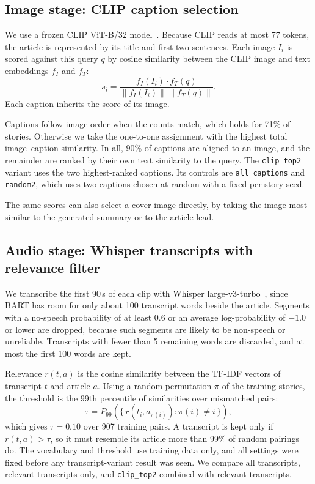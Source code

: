\documentclass[conference]{IEEEtran}
\begin{document}
\subsection{Image stage: CLIP caption selection}
We use a frozen CLIP ViT-B/32 model~\cite{radford2021clip}. Because CLIP reads at most 77 tokens, the article is represented by its title and first two sentences. Each image $I_i$ is scored against this query $q$ by cosine similarity between the CLIP image and text embeddings $f_I$ and $f_T$:
\begin{equation}
s_i = \frac{f_I(I_i)\cdot f_T(q)}{\lVert f_I(I_i)\rVert\,\lVert f_T(q)\rVert}.
\label{eq:clip}
\end{equation}
Each caption inherits the score of its image.

Captions follow image order when the counts match, which holds for 71\% of stories. Otherwise we take the one-to-one assignment with the highest total image--caption similarity. In all, 90\% of captions are aligned to an image, and the remainder are ranked by their own text similarity to the query. The \texttt{clip\_top2} variant uses the two highest-ranked captions. Its controls are \texttt{all\_captions} and \texttt{random2}, which uses two captions chosen at random with a fixed per-story seed.

The same scores can also select a cover image directly, by taking the image most similar to the generated summary or to the article lead.

\subsection{Audio stage: Whisper transcripts with relevance filter}
We transcribe the first 90\,s of each clip with Whisper large-v3-turbo~\cite{radford2023whisper}, since BART has room for only about 100 transcript words beside the article. Segments with a no-speech probability of at least 0.6 or an average log-probability of $-1.0$ or lower are dropped, because such segments are likely to be non-speech or unreliable. Transcripts with fewer than 5 remaining words are discarded, and at most the first 100 words are kept.

Relevance $r(t,a)$ is the cosine similarity between the TF-IDF vectors of transcript $t$ and article $a$. Using a random permutation $\pi$ of the training stories, the threshold is the 99th percentile of similarities over mismatched pairs:
\begin{equation}
\tau = P_{99}\left(\{\, r(t_i, a_{\pi(i)}) : \pi(i)\neq i \,\}\right),
\label{eq:tau}
\end{equation}
which gives $\tau=0.10$ over 907 training pairs. A transcript is kept only if $r(t,a)>\tau$, so it must resemble its article more than 99\% of random pairings do. The vocabulary and threshold use training data only, and all settings were fixed before any transcript-variant result was seen. We compare all transcripts, relevant transcripts only, and \texttt{clip\_top2} combined with relevant transcripts.
\end{document}
